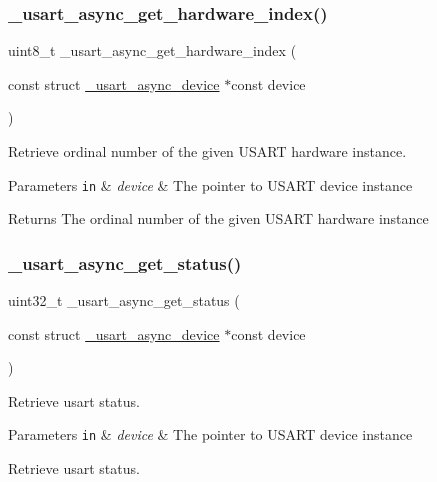 \subsubsection{\texorpdfstring{\+\_\+usart\+\_\+async\+\_\+get\+\_\+hardware\+\_\+index()}{\_usart\_async\_get\_hardware\_index()}}
{\footnotesize\ttfamily uint8\+\_\+t \+\_\+usart\+\_\+async\+\_\+get\+\_\+hardware\+\_\+index (\begin{DoxyParamCaption}\item[{const struct \hyperlink{struct__usart__async__device}{\+\_\+usart\+\_\+async\+\_\+device} $\ast$const}]{device }\end{DoxyParamCaption})}



Retrieve ordinal number of the given U\+S\+A\+RT hardware instance. 


\begin{DoxyParams}[1]{Parameters}
\mbox{\tt in}  & {\em device} & The pointer to U\+S\+A\+RT device instance\\
\hline
\end{DoxyParams}
\begin{DoxyReturn}{Returns}
The ordinal number of the given U\+S\+A\+RT hardware instance 
\end{DoxyReturn}
\mbox{\label{group___h_p_l_ga09d708dc23dacf358d3de8a3a0545c1a}} 
\subsubsection{\texorpdfstring{\+\_\+usart\+\_\+async\+\_\+get\+\_\+status()}{\_usart\_async\_get\_status()}}
{\footnotesize\ttfamily uint32\+\_\+t \+\_\+usart\+\_\+async\+\_\+get\+\_\+status (\begin{DoxyParamCaption}\item[{const struct \hyperlink{struct__usart__async__device}{\+\_\+usart\+\_\+async\+\_\+device} $\ast$const}]{device }\end{DoxyParamCaption})}



Retrieve usart status. 


\begin{DoxyParams}[1]{Parameters}
\mbox{\tt in}  & {\em device} & The pointer to U\+S\+A\+RT device instance\\
\hline
\end{DoxyParams}
Retrieve usart status. \mbox{\label{group___h_p_l_ga11745e0bd0c9d636afbefae8e209665e}} 
